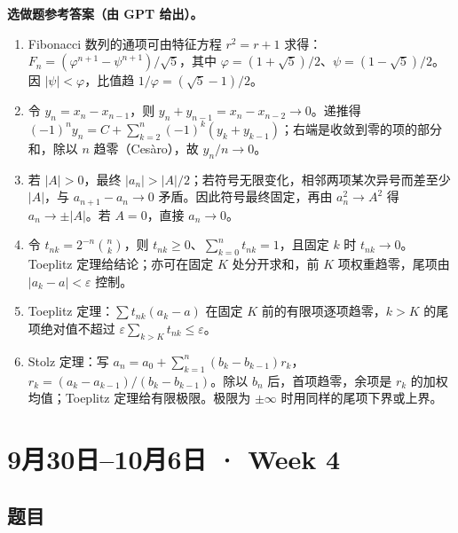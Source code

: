 \documentclass[UTF8,11pt, a4paper, oneside, fontset=none]{ctexbook}
\begin{document}
\noindent\textbf{选做题参考答案（由 GPT 给出）。}
\begin{enumerate}
\item Fibonacci 数列的通项可由特征方程 $r^2=r+1$ 求得：$F_n=(\varphi^{n+1}-\psi^{n+1})/\sqrt5$，其中 $\varphi=(1+\sqrt5)/2$、$\psi=(1-\sqrt5)/2$。因 $|\psi|<\varphi$，比值趋 $1/\varphi=(\sqrt5-1)/2$。
\item 令 $y_n=x_n-x_{n-1}$，则 $y_n+y_{n-1}=x_n-x_{n-2}\to0$。递推得 $(-1)^ny_n=C+\sum_{k=2}^n(-1)^k(y_k+y_{k-1})$；右端是收敛到零的项的部分和，除以 $n$ 趋零（Ces\`aro），故 $y_n/n\to0$。
\item 若 $|A|>0$，最终 $|a_n|>|A|/2$；若符号无限变化，相邻两项某次异号而差至少 $|A|$，与 $a_{n+1}-a_n\to0$ 矛盾。因此符号最终固定，再由 $a_n^2\to A^2$ 得 $a_n\to\pm|A|$。若 $A=0$，直接 $a_n\to0$。
\item 令 $t_{nk}=2^{-n}\binom nk$，则 $t_{nk}\ge0$、$\sum_{k=0}^nt_{nk}=1$，且固定 $k$ 时 $t_{nk}\to0$。Toeplitz 定理给结论；亦可在固定 $K$ 处分开求和，前 $K$ 项权重趋零，尾项由 $|a_k-a|<\varepsilon$ 控制。
\item Toeplitz 定理：$\sum t_{nk}(a_k-a)$ 在固定 $K$ 前的有限项逐项趋零，$k>K$ 的尾项绝对值不超过 $\varepsilon\sum_{k>K}t_{nk}\le\varepsilon$。
\item Stolz 定理：写 $a_n=a_0+\sum_{k=1}^n(b_k-b_{k-1})r_k$，$r_k=(a_k-a_{k-1})/(b_k-b_{k-1})$。除以 $b_n$ 后，首项趋零，余项是 $r_k$ 的加权均值；Toeplitz 定理给有限极限。极限为 $\pm\infty$ 时用同样的尾项下界或上界。
\end{enumerate}

\clearpage

\section{9月30日--10月6日 · Week 4}

\subsection*{题目}
\end{document}
